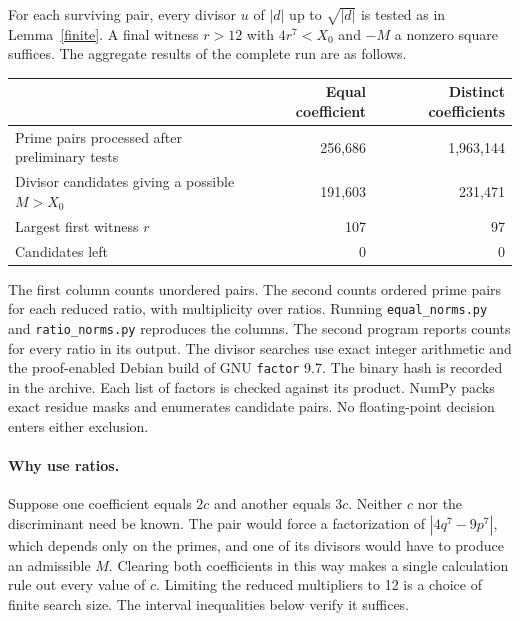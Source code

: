 \documentclass[11pt]{article}
\newcommand{\base}{X_0}
\newcommand{\RatioPairs}{1,963,144}\newcommand{\RatioCandidates}{231,471}\newcommand{\RatioWitness}{97}
\begin{document}
For each surviving pair, every divisor $u$ of $|d|$ up to $\sqrt{|d|}$
is tested as in Lemma~\ref{finite}. A final witness $r>12$ with $4r^7<\base$
and $-M$ a nonzero square suffices. The aggregate results of the complete
run are as follows.
\begin{center}
\begin{tabular}{lrr}\toprule
 & Equal coefficient & Distinct coefficients\\\midrule
Prime pairs processed after preliminary tests & 256,686 & \RatioPairs\\
Divisor candidates giving a possible $M>\base$ & 191,603 & \RatioCandidates\\
Largest first witness $r$ & 107 & \RatioWitness\\
Candidates left & 0 & 0\\\bottomrule
\end{tabular}
\end{center}
The first column counts unordered pairs. The second counts ordered prime
pairs for each reduced ratio, with multiplicity over ratios. Running
\texttt{equal\_norms.py} and \texttt{ratio\_norms.py} reproduces the columns.
The second program reports counts for every ratio in its output.
The divisor searches use exact integer arithmetic and the proof-enabled Debian build of GNU \texttt{factor} 9.7. The binary hash is recorded in the archive. Each list of factors is checked against its product.
NumPy packs exact residue masks and enumerates candidate pairs. No
floating-point decision enters either exclusion.

\paragraph{Why use ratios.} Suppose one coefficient equals $2c$ and
another equals $3c$. Neither $c$ nor the discriminant need be known.
The pair would force a factorization of $|4q^7-9p^7|$, which depends only
on the primes, and one of its divisors would have to produce an admissible
$M$. Clearing both coefficients in this way makes a single calculation
rule out every value of $c$. Limiting the reduced multipliers to 12 is a
choice of finite search size. The interval inequalities below verify it suffices.

\newpage
\end{document}
